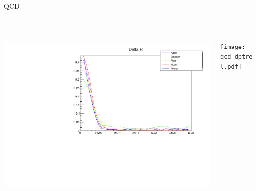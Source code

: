 \documentclass[10pt,handout]{beamer}
\begin{document}
\begin{frame}{ QCD } 

\quad \quad \\
\begin{columns}
\begin{column}{0.5\textwidth}

\includegraphics[scale=.3]{qcd_dr.pdf}

\end{column}
\begin{column}{0.5\textwidth}

\texttt{[image: qcd\_dptrel.pdf]}
\end{column}
\end{columns}
\end{frame}
\end{document}

